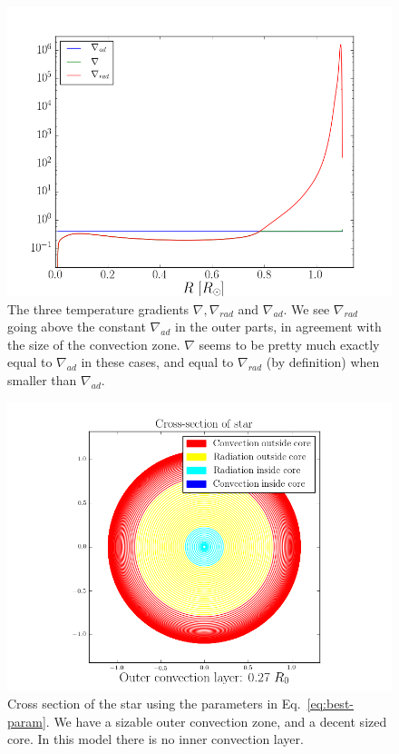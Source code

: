\documentclass[11pt]{article}
\begin{document}
\begin{figure}
  \centering
  \includegraphics[width=\linewidth, height=0.4\textheight]{fig/nablas.png}
  \caption{\label{fig:nablas} The three temperature gradients $\nabla, \nabla_{rad}$ and $\nabla_{ad}$. We see $\nabla_{rad}$ going above the constant $\nabla_{ad}$ in the outer parts, in agreement with the size of the convection zone. $\nabla$ seems to be pretty much exactly equal to $\nabla_{ad}$ in these cases, and equal to $\nabla_{rad}$ (by definition) when smaller than $\nabla_{ad}$.}
\end{figure}

\begin{figure}
    \center
    \includegraphics[width=\linewidth]{fig/cross_section_best.png}
    \caption{\label{fig:cross_section_best.png} Cross section of the star using the parameters in Eq.~\eqref{eq:best-param}. We have a sizable outer convection zone, and a decent sized core. In this model there is no inner convection layer.}
\end{figure}
\end{document}
